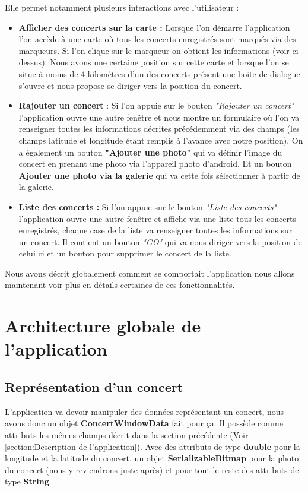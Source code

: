\documentclass{article}
\begin{document}
Elle permet notamment plusieurs interactions avec l'utilisateur : 
\begin{itemize}
\item \textbf{Afficher des concerts sur la carte : } Lorsque l'on démarre l'application l'on accède à une carte où tous les concerts enregistrés sont marqués via des marqueurs. Si l'on clique sur le marqueur on obtient les informations (voir ci dessus). Nous avons une certaine position sur cette carte et lorsque l'on se situe à moins de 4 kilomètres d'un des concerts présent une boite de dialogue s'ouvre et nous propose se diriger vers la position du concert.
\item \textbf{Rajouter un concert} : Si l'on appuie sur le bouton \textit{"Rajouter un concert"} l'application ouvre une autre fenêtre et nous montre un formulaire où l'on va renseigner toutes les informations décrites précédemment via des champs (les champs latitude et longitude étant remplis à l'avance avec notre position). On a également un bouton \textbf{"Ajouter une photo"} qui va définir l'image du concert en prenant une photo via l'appareil photo d'android. Et un bouton \textbf{Ajouter une photo via la galerie} qui va cette fois sélectionner à partir de la galerie.
\item \textbf{Liste des concerts :} Si l'on appuie sur le bouton \textit{"Liste des concerts"} l'application ouvre une autre fenêtre et affiche via une liste tous les concerts enregistrés, chaque case de la liste va renseigner toutes les informations sur un concert. Il contient un bouton \textit{"GO"} qui va nous diriger vers la position de celui ci et un bouton pour supprimer le concert de la liste. 
\end{itemize}

Nous avons décrit globalement comment se comportait l'application nous allons maintenant voir plus en détails certaines de ces fonctionnalités. 

\section{Architecture globale de l'application}

\subsection{Représentation d'un concert}

L'application va devoir manipuler des données représentant un concert, nous avons donc un objet \textbf{ConcertWindowData} fait pour ça.
Il possède comme attributs les mêmes champs décrit dans la section précédente (Voir \ref{section:Description de l'application}). Avec des attributs de type \textbf{double} pour la longitude et la latitude du concert, un objet \textbf{SerializableBitmap} pour la photo du concert (nous y reviendrons juste après) et pour tout le reste des attributs de type \textbf{String}. 
\end{document}
